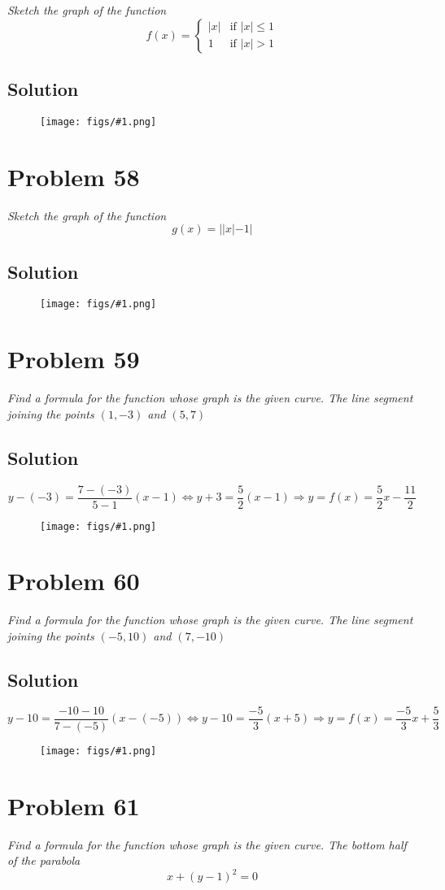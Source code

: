 \documentclass[11pt]{article}
\newcommand{\soln}{\subsection*}
\newcommand{\qn}{\textit}
\newcommand{\imgsoln}[1]{
	\begin{figure}[H]
		\centering
		\texttt{[image: figs/\#1.png]}
	\end{figure}
}
\begin{document}
\qn{Sketch the graph of the function}
\begin{equation*}
	f(x)=
	\begin{cases}
		|x| & \text{if } |x| \le 1\\
		1 & \text{if } |x| > 1
	\end{cases}
\end{equation*}

\soln{Solution}
\imgsoln{1.1.57-ans}

\section*{Problem 58}

\qn{Sketch the graph of the function $$g(x)=||x|-1|$$}

\soln{Solution}
\imgsoln{1.1.58-ans}

\section*{Problem 59}

\qn{Find a formula for the function whose graph is the given curve. The line segment joining the points $(1, -3)$ and $(5,7)$}

\soln{Solution}
\begin{equation*}
	y-(-3)=\frac{7-(-3)}{5-1}(x-1) \Leftrightarrow y+3=\frac{5}{2}(x-1) \Rightarrow y=f(x)=\frac{5}{2}x-\frac{11}{2}
\end{equation*}
\imgsoln{1.1.59-ans}

\section*{Problem 60}

\qn{Find a formula for the function whose graph is the given curve. The line segment joining the points $(-5, 10)$ and $(7, -10)$}

\soln{Solution}
\begin{equation*}
	y-10=\frac{-10-10}{7-(-5)}(x-(-5)) \Leftrightarrow y-10=\frac{-5}{3}(x+5) \Rightarrow y=f(x)=\frac{-5}{3}x+\frac{5}{3}
\end{equation*}
\imgsoln{1.1.60-ans}

\section*{Problem 61}

\qn{Find a formula for the function whose graph is the given curve. The bottom half of the parabola $$x+(y-1)^2=0$$ }
\end{document}

